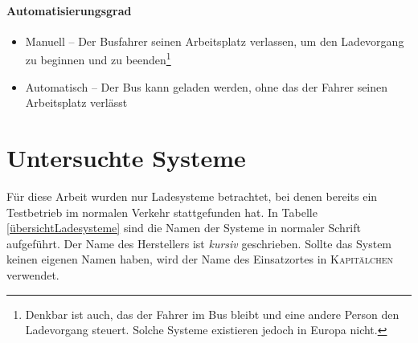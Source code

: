 \paragraph{Automatisierungsgrad}
\begin{itemize}
	\item Manuell – Der Busfahrer seinen Arbeitsplatz verlassen, um den Ladevorgang zu beginnen und zu beenden\footnote{Denkbar ist auch, das der Fahrer im Bus bleibt und eine andere Person den Ladevorgang steuert. Solche Systeme existieren jedoch in Europa nicht.}
	\item Automatisch – Der Bus kann geladen werden, ohne das der Fahrer seinen Arbeitsplatz verlässt
\end{itemize}

\section{Untersuchte Systeme}
Für diese Arbeit wurden nur Ladesysteme betrachtet, bei denen bereits ein Testbetrieb im normalen Verkehr stattgefunden hat. In Tabelle \ref{übersichtLadesysteme} sind die Namen der Systeme in normaler Schrift aufgeführt. Der Name des Herstellers ist \emph{kursiv} geschrieben. Sollte das System keinen eigenen Namen haben, wird der Name des Einsatzortes in \textsc{Kapitälchen} verwendet.
